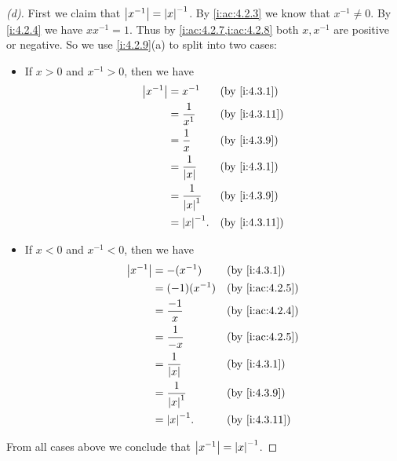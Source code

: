 \begin{proof}[(d)]
  First we claim that \(\left\lvert x^{-1}\right\rvert = \left\lvert x\right\rvert^{-1}\).
  By \cref{i:ac:4.2.3} we know that \(x^{-1} \neq 0\).
  By \cref{i:4.2.4} we have \(x x^{-1} = 1\).
  Thus by \cref{i:ac:4.2.7,i:ac:4.2.8} both \(x, x^{-1}\) are positive or negative.
  So we use \cref{i:4.2.9}(a) to split into two cases:
  \begin{itemize}
    \item If \(x > 0\) and \(x^{-1} > 0\), then we have
          \begin{align*}
            \abs{x^{-1}} & = x^{-1}               &  & \by{i:4.3.1}  \\
                         & = \dfrac{1}{x^1}       &  & \by{i:4.3.11} \\
                         & = \dfrac{1}{x}         &  & \by{i:4.3.9}  \\
                         & = \dfrac{1}{\abs{x}}   &  & \by{i:4.3.1}  \\
                         & = \dfrac{1}{\abs{x}^1} &  & \by{i:4.3.9}  \\
                         & = \abs{x}^{-1}.        &  & \by{i:4.3.11}
          \end{align*}
    \item If \(x < 0\) and \(x^{-1} < 0\), then we have
          \begin{align*}
            \abs{x^{-1}} & = -(x^{-1})            &  & \by{i:4.3.1}    \\
                         & = (-1) (x^{-1})        &  & \by{i:ac:4.2.5} \\
                         & = \dfrac{-1}{x}        &  & \by{i:ac:4.2.4} \\
                         & = \dfrac{1}{-x}        &  & \by{i:ac:4.2.5} \\
                         & = \dfrac{1}{\abs{x}}   &  & \by{i:4.3.1}    \\
                         & = \dfrac{1}{\abs{x}^1} &  & \by{i:4.3.9}    \\
                         & = \abs{x}^{-1}.        &  & \by{i:4.3.11}
          \end{align*}
  \end{itemize}
  From all cases above we conclude that \(\left\lvert x^{-1}\right\rvert = \left\lvert x\right\rvert^{-1}\).


\end{proof}
